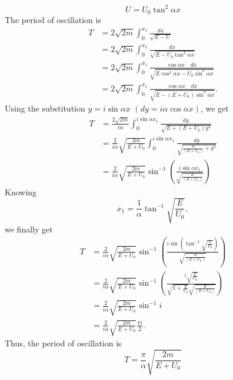 \begin{subproblem}
{
\begin{equation*}
    U=U_0\tan^2{\alpha x}
\end{equation*}
}
{
The period of oscillation is
\begin{align*}
    T &= 2 \sqrt{2m} \int_0^{x_1} \frac{dx}{\sqrt{E-U}} \\
    &= 2 \sqrt{2m} \int_0^{x_1} \frac{dx}{\sqrt{E-U_0\tan^2{\alpha x}}} \\
    &= 2 \sqrt{2m} \int_0^{x_1} \frac{\cos{\alpha x} \quad dx}{\sqrt{E\cos^2{\alpha x}-U_0\sin^2{\alpha x}}} \\
    &= 2 \sqrt{2m} \int_0^{x_1} \frac{\cos{\alpha x} \quad dx}{\sqrt{E-(E+U_0)\sin^2{\alpha x}}}.
\end{align*}
Using the substitution $y=i\sin{\alpha x}$ $\left(dy = i\alpha\cos{\alpha x}\right)$, we get
\begin{align*}
    T &= \frac{2\sqrt{2m}}{i\alpha} \int_0^{i\sin{\alpha x_1}} \frac{dy}{\sqrt{E+\left( E+U_0 \right)y^2}} \\
    &=  \frac{2}{i\alpha}\sqrt{\frac{2m}{E+U_0}} \int_0^{i\sin{\alpha x_1}} \frac{dy}{\sqrt{\frac{E}{\left( E+U_0 \right)}+y^2}} \\
    &= \frac{2}{i\alpha}\sqrt{\frac{2m}{E+U_0}} \sin^{-1}{\left( \frac{i\sin{\alpha x_1}}{\sqrt{\frac{E}{\left(E+U_0\right)}}} \right)}
\end{align*}
Knowing
\begin{equation*}
    x_1 = \frac{1}{\alpha} \tan^{-1}{\sqrt{\frac{E}{U_0}}},
\end{equation*}
we finally get
\begin{align*}
    T &= \frac{2}{i\alpha}\sqrt{\frac{2m}{E+U_0}} \sin^{-1}{\left( \frac{i\sin{\left(\tan^{-1}{\sqrt{\frac{E}{U_0}}}\right)}}{\sqrt{\frac{E}{\left(E+U_0\right)}}} \right)} \\
    &= \frac{2}{i\alpha}\sqrt{\frac{2m}{E+U_0}} \sin^{-1}{\left( \frac{i\sqrt{\frac{E}{U_0}}}{\sqrt{1+\frac{E}{U_0}}\sqrt{\frac{E}{\left(E+U_0\right)}}} \right)} \\
    &= \frac{2}{i\alpha}\sqrt{\frac{2m}{E+U_0}} \sin^{-1}{i} \\
    &= \frac{2}{i\alpha}\sqrt{\frac{2m}{E+U_0}} \frac{\pi i}{2}.
\end{align*}
Thus, the period of oscillation is
}
{
\begin{equation*}
    T=\frac{\pi}{\alpha}\sqrt{\frac{2m}{E+U_0}}
\end{equation*}
}
\end{subproblem}

